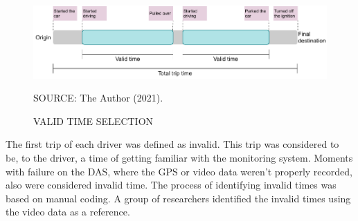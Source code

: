 \begin{figure}[!htbp]
    \centering\footnotesize
    \captionsetup{font=footnotesize}
    \caption{VALID TIME SELECTION}
    \includegraphics{fig/validtime.pdf}
    \label{fig:validtime}
    \par SOURCE: The Author (2021).
\end{figure}

The first trip of each driver was defined as invalid. This trip was considered to be, to the driver, a time of getting familiar with the monitoring system. Moments with failure on the DAS, where the GPS or video data weren't properly recorded, also were considered invalid time. The process of identifying invalid times was based on manual coding. A group of researchers identified the invalid times using the video data as a reference. 



